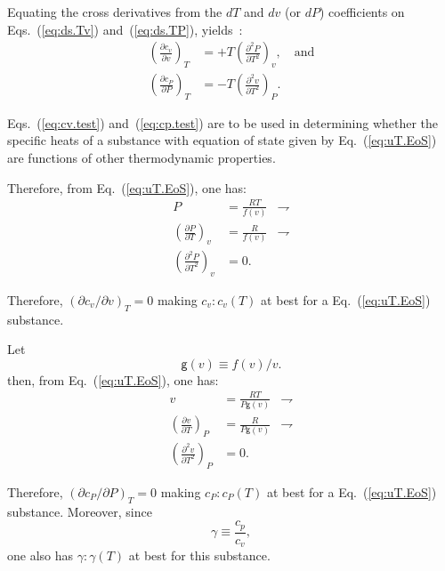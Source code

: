 \documentclass[fleqn,11pt]{SelfArx}
\newcommand{\parxyz}[3]{\left(\frac{\partial {{#1}}}{\partial {{#2}}}\right)_{\!\!\!{#3}}}
\newcommand{\inlxyz}[3]{({\partial {{#1}}}/{\partial {{#2}}})_{{#3}}}
\begin{document}
    Equating  the  cross  derivatives  from  the  $dT$  and  $dv$  (or  $dP$)  coefficients   on
    Eqs.~(\ref{eq:ds.Tv}) and~(\ref{eq:ds.TP}), yields~\cite{2013-CengelYA+BolesMA-AMGH}:
    \begin{align}
        \parxyz{c_v}vT & = +T\left(\frac{\partial^2P}{\partial T^2}\right)_{\!\!\!v},
        \quad\mbox{and}\label{eq:cv.test} \\
        \parxyz{c_P}PT & = -T\left(\frac{\partial^2v}{\partial T^2}\right)_{\!\!\!P}.
        \label{eq:cp.test}
    \end{align}

    Eqs.~(\ref{eq:cv.test}) and~(\ref{eq:cp.test}) are to be used  in  determining  whether  the
    specific heats of a substance with equation of  state  given  by  Eq.~(\ref{eq:uT.EoS})  are
    functions of other thermodynamic properties.

    Therefore, from Eq.~(\ref{eq:uT.EoS}), one has:
    \begin{align}
        P & = \frac{RT}{f(v)} & \rightharpoondown \\
        \parxyz PTv & = \frac{R}{f(v)} & \rightharpoondown \\
        \left(\frac{\partial^2P}{\partial T^2}\right)_{\!\!\!v} & = 0.
        \label{eq:cv.test.0}
    \end{align}

    Therefore, $\inlxyz{c_v}vT = 0$ making $c_v\!:\!c_v(T)$ at best for a  Eq.~(\ref{eq:uT.EoS})
    substance.

    Let
    \begin{equation}
        \mathsf{g}(v) \equiv f(v)/v.
        \label{eq:def.g}
    \end{equation}
    \noindent then, from Eq.~(\ref{eq:uT.EoS}), one has:
    \begin{align}
        v & = \frac{RT}{P\mathsf{g}(v)} & \rightharpoondown \\
        \parxyz vTP & = \frac{R}{P\mathsf{g}(v)} & \rightharpoondown
        \label{eq:vTP} \\
        \left(\frac{\partial^2v}{\partial T^2}\right)_{\!\!\!P} & = 0.
        \label{eq:cp.test.0}
    \end{align}

    Therefore, $\inlxyz{c_P}PT = 0$ making $c_P\!:\!c_P(T)$ at best for a  Eq.~(\ref{eq:uT.EoS})
    substance. Moreover, since
    \begin{equation}
        \gamma \equiv \frac{c_p}{c_v},
        \label{eq:def.gamma}
    \end{equation}
    \noindent one also has $\gamma\!:\!\gamma(T)$ at best for this substance.
\end{document}
